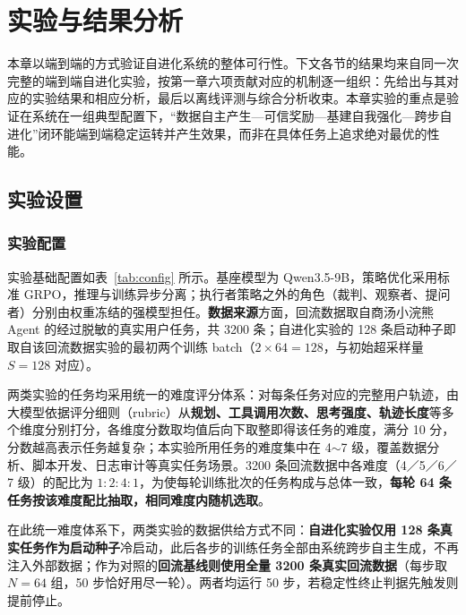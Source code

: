 \chapter{实验与结果分析}

本章以端到端的方式验证自进化系统的整体可行性。下文各节的结果均来自同一次完整的端到端自进化实验，按第一章六项贡献对应的机制逐一组织：先给出与其对应的实验结果和相应分析，最后以离线评测与综合分析收束。本章实验的重点是验证在系统在一组典型配置下，“数据自主产生—可信奖励—基建自我强化—跨步自进化”闭环能端到端稳定运转并产生效果，而非在具体任务上追求绝对最优的性能。

\section{实验设置}
\label{sec:exp_setup}

\subsection{实验配置}

实验基础配置如表~\ref{tab:config} 所示。基座模型为 Qwen3.5-9B，策略优化采用标准 GRPO，推理与训练异步分离；执行者策略之外的角色（裁判、观察者、提问者）分别由权重冻结的强模型担任。\textbf{数据来源}方面，回流数据取自商汤小浣熊 Agent 的经过脱敏的真实用户任务，共 3200 条；自进化实验的 128 条启动种子即取自该回流数据实验的最初两个训练 batch（$2\times 64=128$，与初始超采样量 $S=128$ 对应）。

两类实验的任务均采用统一的难度评分体系：对每条任务对应的完整用户轨迹，由大模型依据评分细则（rubric）从\textbf{规划、工具调用次数、思考强度、轨迹长度}等多个维度分别打分，各维度分数取均值后向下取整即得该任务的难度，满分 10 分，分数越高表示任务越复杂；本实验所用任务的难度集中在 4$\sim$7 级，覆盖数据分析、脚本开发、日志审计等真实任务场景。3200 条回流数据中各难度（4／5／6／7 级）的配比为 $1:2:4:1$，为使每轮训练批次的任务构成与总体一致，\textbf{每轮 64 条任务按该难度配比抽取，相同难度内随机选取}。

在此统一难度体系下，两类实验的数据供给方式不同：\textbf{自进化实验仅用 128 条真实任务作为启动种子}冷启动，此后各步的训练任务全部由系统跨步自主生成，不再注入外部数据；作为对照的\textbf{回流基线则使用全量 3200 条真实回流数据}（每步取 $N=64$ 组，50 步恰好用尽一轮）。两者均运行 50 步，若稳定性终止判据先触发则提前停止。

